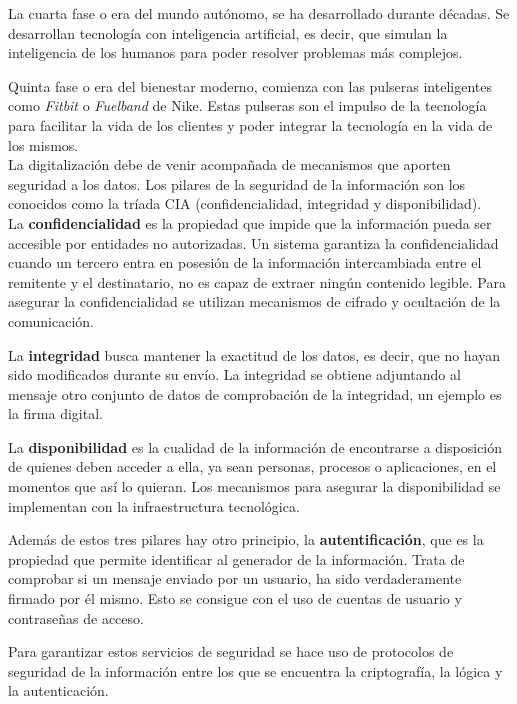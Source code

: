La cuarta fase o era del mundo autónomo, se ha desarrollado durante décadas. Se desarrollan tecnología con inteligencia artificial, es decir, que simulan la inteligencia de los humanos para poder resolver problemas más complejos.

Quinta fase o era del bienestar moderno, comienza con las pulseras inteligentes como \textit{Fitbit} o \textit{Fuelband} de Nike. Estas pulseras son el impulso de la tecnología para facilitar la vida de los clientes y poder integrar la tecnología en la vida de los mismos.\\

La digitalización debe de venir acompañada de mecanismos que aporten seguridad a los datos. Los pilares de la seguridad de la información son los conocidos como la tríada CIA (confidencialidad, integridad y  disponibilidad)\cite{servicios-seguridad}.\\

La \textbf{confidencialidad} es la propiedad que impide que la información pueda ser accesible por entidades no autorizadas. Un sistema garantiza la confidencialidad cuando un tercero entra en posesión de la información intercambiada entre el remitente y el destinatario, no es capaz de extraer ningún contenido legible. Para asegurar la confidencialidad se utilizan mecanismos de cifrado y ocultación de la comunicación.

La \textbf{integridad} busca mantener la exactitud de los datos, es decir, que no hayan sido modificados durante su envío. La integridad se obtiene adjuntando al mensaje otro conjunto de datos de comprobación de la integridad, un ejemplo es la firma digital.

La \textbf{disponibilidad} es la cualidad de la información de encontrarse a disposición de quienes deben acceder a ella, ya sean personas, procesos o aplicaciones, en el momentos que así lo quieran. Los mecanismos para asegurar la disponibilidad se implementan con la infraestructura tecnológica.

Además de estos tres pilares hay otro principio, la \textbf{autentificación}, que es la propiedad que permite identificar al generador de la información. Trata de comprobar si un mensaje enviado por un usuario, ha sido verdaderamente firmado por él mismo. Esto se consigue con el uso de cuentas de usuario y contraseñas de acceso.

Para garantizar estos servicios de seguridad se hace uso de protocolos de seguridad de la información entre los que se encuentra la criptografía, la lógica y la autenticación.\\

